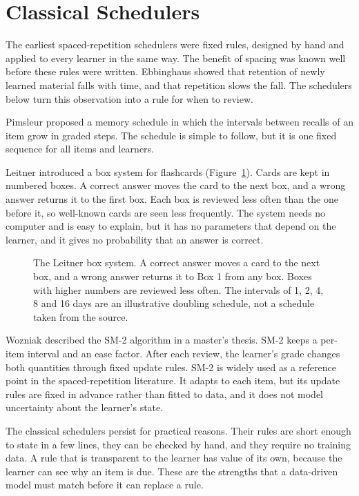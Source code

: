 \section{Classical Schedulers}
\label{sec:lit-classical}

The earliest spaced-repetition schedulers were fixed rules, designed by hand and applied to every
learner in the same way. The benefit of spacing was known well before these rules were written.
Ebbinghaus \cite{ebbinghaus1885memory} showed that retention of newly learned material falls with
time, and that repetition slows the fall. The schedulers below turn this observation into a rule for
when to review.

Pimsleur \cite{pimsleur1967} proposed a memory schedule in which the intervals between recalls of an
item grow in graded steps. The schedule is simple to follow, but it is one fixed sequence for all
items and learners.

Leitner \cite{leitner1972lernen} introduced a box system for flashcards (Figure~\ref{fig:tk_leitner}).
Cards are kept in numbered boxes. A correct answer moves the card to the next box, and a wrong answer
returns it to the first box. Each box is reviewed less often than the one before it, so well-known
cards are seen less frequently. The system needs no computer and is easy to explain, but it has no
parameters that depend on the learner, and it gives no probability that an answer is correct.

\begin{figure}[htbp]
  \centering
  
  \caption{The Leitner box system. A correct answer moves a card to the next box, and a wrong answer
    returns it to Box 1 from any box. Boxes with higher numbers are reviewed less often. The intervals of
    1, 2, 4, 8 and 16 days are an illustrative doubling schedule, not a schedule taken from the source.}
  \label{fig:tk_leitner}
\end{figure}

Wozniak \cite{wozniak1990sm2} described the SM-2 algorithm in a master's thesis. SM-2 keeps a
per-item interval and an ease factor. After each review, the learner's grade changes both quantities
through fixed update rules. SM-2 is widely used as a reference point in the spaced-repetition
literature. It adapts to each item, but its update rules are fixed in advance rather than fitted to
data, and it does not model uncertainty about the learner's state.

The classical schedulers persist for practical reasons. Their rules are short enough to state in a few
lines, they can be checked by hand, and they require no training data. A rule that is transparent to the
learner has value of its own, because the learner can see why an item is due. These are the strengths that a
data-driven model must match before it can replace a rule.

